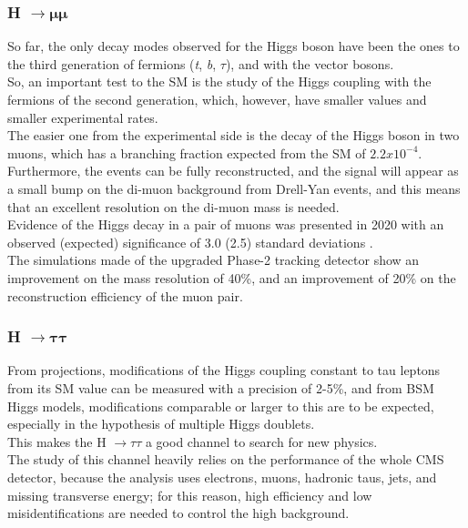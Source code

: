 \subsubsection{H $\bm{\longrightarrow \mu\mu}$}
So far, the only decay modes observed for the Higgs boson have been the ones to the third generation of fermions (\emph{t}, \emph{b}, $\tau$), and with the vector bosons. \\ 
So, an important test to the SM is the study of the Higgs coupling with the fermions of the second generation, which, however, have smaller values and smaller experimental rates.\\
The easier one from the experimental side is the decay of the Higgs boson in two muons, which has a branching fraction expected from the SM of $2.2 x 10^{-4}$. Furthermore, the events can be fully reconstructed, and the signal will appear as a small bump on the di-muon background from Drell-Yan events, and this means that an excellent resolution on the di-muon mass is needed.
\\
Evidence of the Higgs decay in a pair of muons was presented in 2020 with an observed (expected) significance of 3.0 (2.5) standard deviations \cite{H_mumu}.\\
The simulations made of the upgraded Phase-2 tracking detector show an improvement on the mass resolution of 40\%, and an improvement of 20\% on the reconstruction efficiency of the muon pair.
\subsubsection{H $\bm{\longrightarrow \tau \tau}$}
From projections, modifications of the Higgs coupling constant to tau leptons from its SM value can be measured with a precision of 2-5\%, and from BSM Higgs models, modifications comparable or larger to this are to be expected, especially in the hypothesis of multiple Higgs doublets.\\
This makes the H $\longrightarrow \tau \tau$ a good channel to search for new physics.\\
The study of this channel heavily relies on the performance of the whole CMS detector, because the analysis uses electrons, muons, hadronic taus, jets, and missing transverse energy; for this reason, high efficiency and low misidentifications are needed to control the high background. \\
